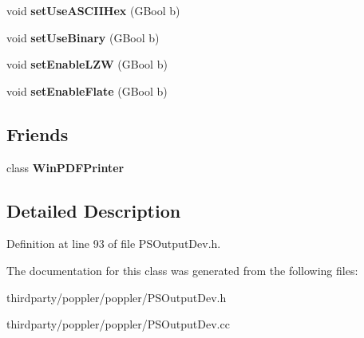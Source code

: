 \begin{DoxyCompactItemize}
\mbox{\label{class_p_s_output_dev_a1192fa8f81af5e7655a8b9d617675791}} 
void {\bfseries set\+Use\+A\+S\+C\+I\+I\+Hex} (G\+Bool b)
\item 
\mbox{\label{class_p_s_output_dev_a161c11aed6ca3072973ee830d99be70b}} 
void {\bfseries set\+Use\+Binary} (G\+Bool b)
\item 
\mbox{\label{class_p_s_output_dev_ab0670857b99f0535bd7b69b43f930123}} 
void {\bfseries set\+Enable\+L\+ZW} (G\+Bool b)
\item 
\mbox{\label{class_p_s_output_dev_a5262bb02b4b84bb743fc8fa5dbc60b87}} 
void {\bfseries set\+Enable\+Flate} (G\+Bool b)
\end{DoxyCompactItemize}
\subsection*{Friends}
\begin{DoxyCompactItemize}
\item 
\mbox{\label{class_p_s_output_dev_a14e54a8b42941051b680061ab1329919}} 
class {\bfseries Win\+P\+D\+F\+Printer}
\end{DoxyCompactItemize}


\subsection{Detailed Description}


Definition at line 93 of file P\+S\+Output\+Dev.\+h.



The documentation for this class was generated from the following files\+:\begin{DoxyCompactItemize}
\item 
thirdparty/poppler/poppler/P\+S\+Output\+Dev.\+h\item 
thirdparty/poppler/poppler/P\+S\+Output\+Dev.\+cc\end{DoxyCompactItemize}
